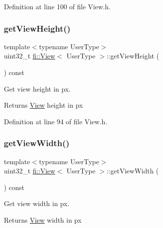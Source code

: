 Definition at line 100 of file View.\+h.

\mbox{\label{classfi_1_1View_ad56a6ba2d23c2352403e9e36526a163b}} 
\subsubsection{\texorpdfstring{get\+View\+Height()}{getViewHeight()}}
{\footnotesize\ttfamily template$<$typename User\+Type$>$ \\
uint32\+\_\+t \hyperlink{classfi_1_1View}{fi\+::\+View}$<$ User\+Type $>$\+::get\+View\+Height (\begin{DoxyParamCaption}{ }\end{DoxyParamCaption}) const\hspace{0.3cm}{\ttfamily [inline]}}



Get view height in px. 

\begin{DoxyReturn}{Returns}
\hyperlink{classfi_1_1View}{View} height in px 
\end{DoxyReturn}


Definition at line 94 of file View.\+h.

\mbox{\label{classfi_1_1View_aa2682cae27645a080fb51ce39d1667b4}} 
\subsubsection{\texorpdfstring{get\+View\+Width()}{getViewWidth()}}
{\footnotesize\ttfamily template$<$typename User\+Type$>$ \\
uint32\+\_\+t \hyperlink{classfi_1_1View}{fi\+::\+View}$<$ User\+Type $>$\+::get\+View\+Width (\begin{DoxyParamCaption}{ }\end{DoxyParamCaption}) const\hspace{0.3cm}{\ttfamily [inline]}}



Get view width in px. 

\begin{DoxyReturn}{Returns}
\hyperlink{classfi_1_1View}{View} width in px 
\end{DoxyReturn}



